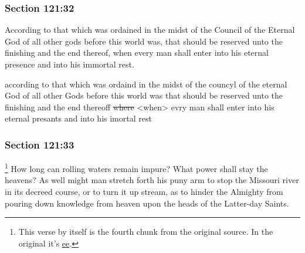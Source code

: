 	\subsubsection{Section 121:32} %
		\label{DC121-32}

		According to that which was ordained in the midst of the Council of the Eternal God of all other gods before this world was, that should be reserved unto the finishing and the end thereof, when every man shall enter into his eternal presence and into his immortal rest.

		\begin{framed}
		\scriptsize
			\begin{compactdesc}
				\item[JSP] according to that which was ordaind in the midst of the councyl of the eternal God of all other Gods before this world was that should be reserved unto the finishing and the end thereoff \sout{where} <when> evry man shall enter into his eternal presants and into his imortal rest
			\end{compactdesc}
		\end{framed}

	\subsubsection{Section 121:33} %
		\label{DC121-33}

			\footnote{%
				This verse by itself is the fourth chunk from the original source. In the original it's \hyperlink{EMS-1839-JS-20-MAR-1839-ee}{ee}.
				}%
		How long can rolling waters remain impure?  What power shall stay the heavens?  As well might man stretch forth his puny arm to stop the Missouri river in its decreed course, or to turn it up stream, as to hinder the Almighty from pouring down knowledge from heaven upon the heads of the Latter-day Saints.


